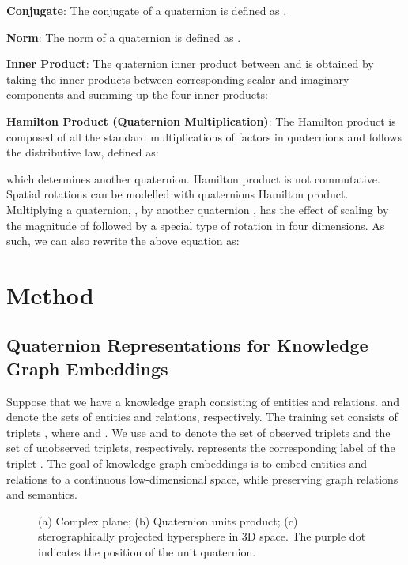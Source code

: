 \documentclass{article}
\begin{document}
\textbf{Conjugate}: The conjugate of a quaternion  is defined as .

\textbf{Norm}: The norm of a quaternion is defined as .



\textbf{Inner Product}: The quaternion inner product between  and  is obtained by taking the inner products between corresponding scalar and imaginary components and summing up the four inner products:
    
\textbf{Hamilton Product (Quaternion Multiplication)}:  The Hamilton product is composed of all the standard multiplications of factors in quaternions and follows the distributive law, defined as:

which determines another quaternion. Hamilton product is not commutative. Spatial rotations can be modelled with quaternions Hamilton product. Multiplying a quaternion, , by another quaternion , has the effect of scaling  by the magnitude of  followed by a special type of rotation in four dimensions.  As such, we can also rewrite the above equation as:





\section{Method}










\subsection{Quaternion Representations for Knowledge Graph Embeddings}
Suppose that we have a knowledge graph  consisting of  entities and  relations.  and  denote the sets of entities and relations, respectively. The training set consists of triplets , where  and . We use  and  to denote the set of observed triplets and the set of unobserved triplets, respectively.  represents the corresponding label of the triplet . The goal of knowledge graph embeddings is to embed entities and relations to a continuous low-dimensional space, while preserving graph relations and semantics.









\begin{figure}[tbp]
\centering
{}
\quad
{}
\quad
{}
\caption{(a) Complex plane;  (b) Quaternion units product; (c) sterographically projected hypersphere in 3D space. The purple dot indicates the position of the unit quaternion.}
\label{fig:quaternion}
\vspace{-1em}
\end{figure}
\end{document}
